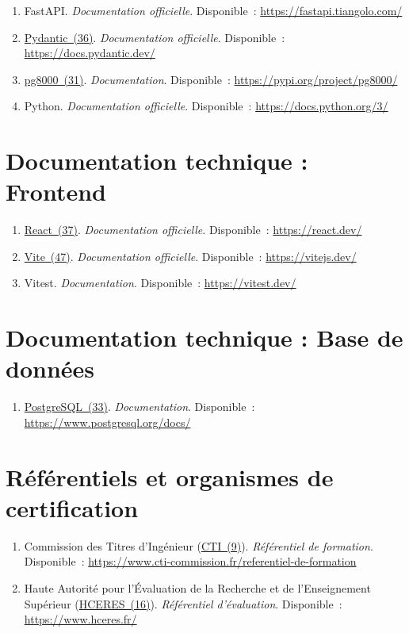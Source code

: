 \documentclass[12pt,a4paper]{report}
\begin{document}
\begin{enumerate}[resume]
  \item FastAPI. \textit{Documentation officielle}. Disponible~: \url{https://fastapi.tiangolo.com/}
  \item \hyperlink{abbr-Pydantic}{Pydantic~(36)}. \textit{Documentation officielle}. Disponible~: \url{https://docs.pydantic.dev/}
  \item \hyperlink{abbr-pg8000}{pg8000~(31)}. \textit{Documentation}. Disponible~: \url{https://pypi.org/project/pg8000/}
  \item Python. \textit{Documentation officielle}. Disponible~: \url{https://docs.python.org/3/}
\end{enumerate}

\section*{Documentation technique : Frontend}

\begin{enumerate}[resume]
  \item \hyperlink{abbr-React}{React~(37)}. \textit{Documentation officielle}. Disponible~: \url{https://react.dev/}
  \item \hyperlink{abbr-Vite}{Vite~(47)}. \textit{Documentation officielle}. Disponible~: \url{https://vitejs.dev/}
  \item Vitest. \textit{Documentation}. Disponible~: \url{https://vitest.dev/}
\end{enumerate}

\section*{Documentation technique : Base de données}

\begin{enumerate}[resume]
  \item \hyperlink{abbr-PostgreSQL}{PostgreSQL~(33)}. \textit{Documentation}. Disponible~: \url{https://www.postgresql.org/docs/}
\end{enumerate}

\section*{Référentiels et organismes de certification}

\begin{enumerate}[resume]
  \item Commission des Titres d'Ingénieur (\hyperlink{abbr-CTI}{CTI~(9)}). \textit{Référentiel de formation}. Disponible~: \url{https://www.cti-commission.fr/referentiel-de-formation}
  \item Haute Autorité pour l'Évaluation de la Recherche et de l'Enseignement Supérieur (\hyperlink{abbr-HCERES}{HCERES~(16)}). \textit{Référentiel d'évaluation}. Disponible~: \url{https://www.hceres.fr/}
\end{enumerate}
\end{document}
